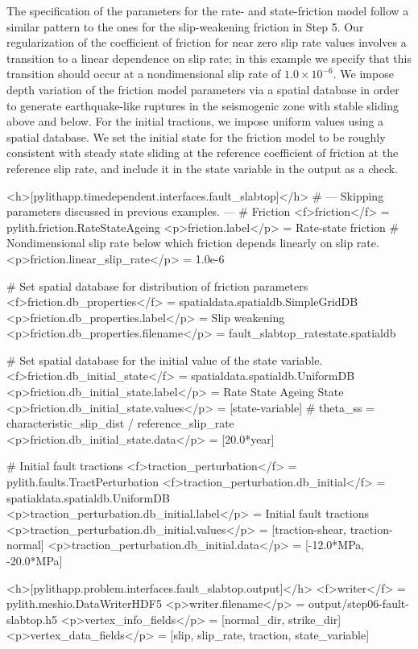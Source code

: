 The specification of the parameters for the rate- and state-friction
model follow a similar pattern to the ones for the slip-weakening
friction in Step 5. Our regularization of the coefficient of friction
for near zero slip rate values involves a transition to a linear
dependence on slip rate; in this example we specify that this
transition should occur at a nondimensional slip rate of
$1.0 \times 10^{-6}$. We impose depth variation of the friction model
parameters via a  spatial database in order to
generate earthquake-like ruptures in the seismogenic zone with stable
sliding above and below. For the initial tractions, we impose uniform
values using a  spatial database. We set the initial
state for the friction model to be roughly consistent with steady
state sliding at the reference coefficient of friction at the
reference slip rate, and include it in the state variable in the
output as a check.
\begin{cfg}
<h>[pylithapp.timedependent.interfaces.fault_slabtop]</h>
# --- Skipping parameters discussed in previous examples. ---
# Friction
<f>friction</f> = pylith.friction.RateStateAgeing
<p>friction.label</p> = Rate-state friction
# Nondimensional slip rate below which friction depends linearly on slip rate.
<p>friction.linear_slip_rate</p> = 1.0e-6

# Set spatial database for distribution of friction parameters
<f>friction.db_properties</f> = spatialdata.spatialdb.SimpleGridDB
<p>friction.db_properties.label</p> = Slip weakening
<p>friction.db_properties.filename</p> = fault_slabtop_ratestate.spatialdb

# Set spatial database for the initial value of the state variable.
<f>friction.db_initial_state</f> = spatialdata.spatialdb.UniformDB
<p>friction.db_initial_state.label</p> = Rate State Ageing State
<p>friction.db_initial_state.values</p> = [state-variable]
# theta_ss = characteristic_slip_dist / reference_slip_rate
<p>friction.db_initial_state.data</p> = [20.0*year]

# Initial fault tractions
<f>traction_perturbation</f> = pylith.faults.TractPerturbation
<f>traction_perturbation.db_initial</f> = spatialdata.spatialdb.UniformDB
<p>traction_perturbation.db_initial.label</p> = Initial fault tractions
<p>traction_perturbation.db_initial.values</p> = [traction-shear, traction-normal]
<p>traction_perturbation.db_initial.data</p> = [-12.0*MPa, -20.0*MPa]

<h>[pylithapp.problem.interfaces.fault_slabtop.output]</h>
<f>writer</f> = pylith.meshio.DataWriterHDF5
<p>writer.filename</p> = output/step06-fault-slabtop.h5
<p>vertex_info_fields</p> = [normal_dir, strike_dir]
<p>vertex_data_fields</p> = [slip, slip_rate, traction, state_variable]
\end{cfg}

